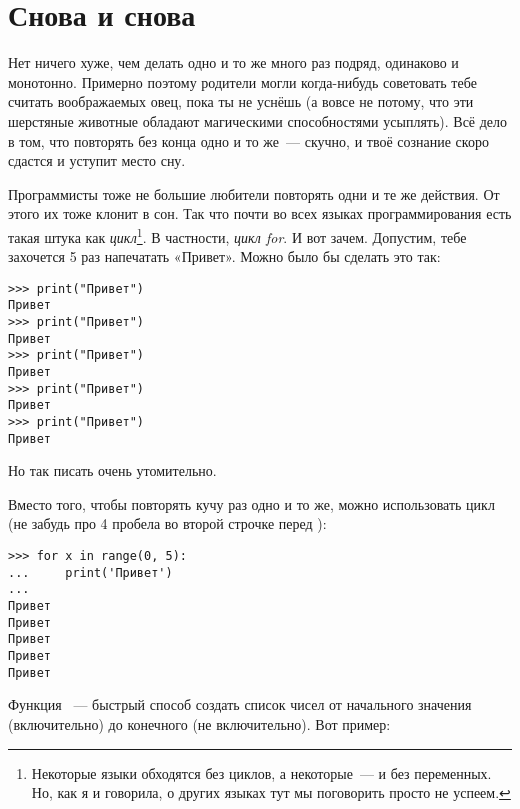 

\chapter{Снова и снова}\label{ch:againandagain}

Нет ничего хуже, чем делать одно и то же много раз подряд, одинаково и монотонно. Примерно поэтому родители могли когда-нибудь советовать тебе считать воображаемых овец, пока ты не уснёшь (а вовсе не потому, что эти шерстяные животные обладают магическими способностями усыплять). Всё дело в том, что повторять без конца одно и то же — скучно, и твоё сознание скоро сдастся и уступит место сну.

Программисты тоже не большие любители повторять одни и те же действия. От этого их тоже клонит в сон. Так что почти во всех языках программирования есть такая штука как \textit{цикл}\footnote{Некоторые языки обходятся без циклов, а некоторые — и без переменных. Но, как я и говорила, о других языках тут мы поговорить просто не успеем.}. В частности, \textit{цикл for}. И вот зачем. Допустим, тебе захочется 5 раз напечатать «Привет». Можно было бы сделать это так:
\begin{listing}
\begin{verbatim}
>>> print("Привет")
Привет
>>> print("Привет")
Привет
>>> print("Привет")
Привет
>>> print("Привет")
Привет
>>> print("Привет")
Привет
\end{verbatim}
\end{listing}

Но так писать очень утомительно.

Вместо того, чтобы повторять кучу раз одно и то же, можно использовать цикл  (не забудь про 4 пробела во второй строчке перед ):

\begin{verbatim}
>>> for x in range(0, 5):
...     print('Привет')
... 
Привет
Привет
Привет
Привет
Привет
\end{verbatim}

Функция  — быстрый способ создать список чисел от начального значения (включительно) до конечного (не включительно). Вот пример:

